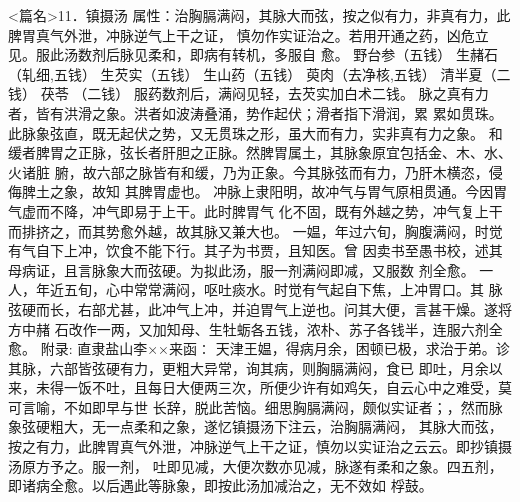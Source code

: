 \documentclass[a4paper,12pt,UTF8,twoside]{ctexbook}
\begin{document}
<篇名>11．镇摄汤
属性：治胸膈满闷，其脉大而弦，按之似有力，非真有力，此脾胃真气外泄，冲脉逆气上干之证， 
慎勿作实证治之。若用开通之药，凶危立见。服此汤数剂后脉见柔和，即病有转机，多服自 
愈。 
野台参（五钱） 生赭石（轧细,五钱） 生芡实（五钱） 生山药（五钱） 萸肉（去净核,五钱） 清半夏（二钱） 茯苓 
（二钱） 
服药数剂后，满闷见轻，去芡实加白术二钱。 
脉之真有力者，皆有洪滑之象。洪者如波涛叠涌，势作起伏；滑者指下滑润，累 
累如贯珠。此脉象弦直，既无起伏之势，又无贯珠之形，虽大而有力，实非真有力之象。 
和缓者脾胃之正脉，弦长者肝胆之正脉。然脾胃属土，其脉象原宜包括金、木、水、火诸脏 
腑，故六部之脉皆有和缓，乃为正象。今其脉弦而有力，乃肝木横恣，侵侮脾土之象，故知 
其脾胃虚也。 
冲脉上隶阳明，故冲气与胃气原相贯通。今因胃气虚而不降，冲气即易于上干。此时脾胃气 
化不固，既有外越之势，冲气复上干而排挤之，而其势愈外越，故其脉又兼大也。 
一媪，年过六旬，胸腹满闷，时觉有气自下上冲，饮食不能下行。其子为书贾，且知医。曾 
因卖书至愚书校，述其母病证，且言脉象大而弦硬。为拟此汤，服一剂满闷即减，又服数 
剂全愈。 
一人，年近五旬，心中常常满闷，呕吐痰水。时觉有气起自下焦，上冲胃口。其 
脉弦硬而长，右部尤甚，此冲气上冲，并迫胃气上逆也。问其大便，言甚干燥。遂将方中赭 
石改作一两，又加知母、生牡蛎各五钱，浓朴、苏子各钱半，连服六剂全愈。 
附录: 
直隶盐山李××来函∶ 
天津王媪，得病月余，困顿已极，求治于弟。诊其脉，六部皆弦硬有力，更粗大异常，询其病，则胸膈满闷，食已 
即吐，月余以来，未得一饭不吐，且每日大便两三次，所便少许有如鸡矢，自云心中之难受，莫可言喻，不如即早与世 
长辞，脱此苦恼。细思胸膈满闷，颇似实证者；，然而脉象弦硬粗大，无一点柔和之象，遂忆镇摄汤下注云，治胸膈满闷， 
其脉大而弦，按之有力，此脾胃真气外泄，冲脉逆气上干之证，慎勿以实证治之云云。即抄镇摄汤原方予之。服一剂， 
吐即见减，大便次数亦见减，脉遂有柔和之象。四五剂，即诸病全愈。以后遇此等脉象，即按此汤加减治之，无不效如 
桴鼓。 
\end{document}

